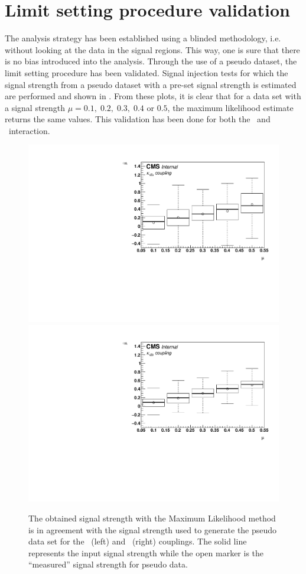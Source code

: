 \section{Limit setting procedure validation}
\label{sec:val}
The analysis strategy has been established using a blinded methodology, i.e. without looking at the data in the signal regions. This way, one is sure that there is no bias introduced into the analysis. Through the use of a pseudo dataset, the limit setting procedure has been validated. Signal injection tests for which the signal strength from a pseudo dataset with a pre-set  signal strength is estimated are performed and shown in . From these plots, it is clear that for a data set with a signal strength $\mu= 0.1,\;0.2,\;0.3,\;0.4$ or $0.5$, the maximum likelihood estimate returns the same values. This validation has been done for both the \Zut\ and \Zct\ interaction.
\begin{figure}[htbp]
	\centering
	 \includegraphics[width=0.49\linewidth]{6_Search/Figures/SignalInjection/plotZuttrial}
	 \includegraphics[width=0.49\linewidth]{6_Search/Figures/SignalInjection/plotZcttrial}
	\caption{The  obtained signal strength with the Maximum Likelihood method is in agreement with the signal strength used to generate the pseudo data set for the \Zut\ (left) and \Zct\ (right) couplings. The solid line represents the input signal strength while the open marker is the ``measured'' signal strength for pseudo data.}
	\label{fig:plotzut}
\end{figure}

